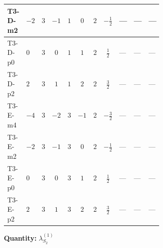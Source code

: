 \documentclass[8pt]{article}
\begin{document}
\begin{landscape}
\begin{longtable}{@{}llcccccc >{\raggedright\arraybackslash}p{0.21\linewidth} >{\raggedright\arraybackslash}p{0.21\linewidth} >{\raggedright\arraybackslash}p{0.21\linewidth}@{}}
\midrule
T3-D-m2 & $-2$ & $3$ & $-1$ & $1$ & $0$ & $2$ & $-\frac{1}{2}$ & --- & --- & --- \\
\midrule
T3-D-p0 & $0$ & $3$ & $0$ & $1$ & $1$ & $2$ & $\frac{1}{2}$ & --- & --- & --- \\
\midrule
T3-D-p2 & $2$ & $3$ & $1$ & $1$ & $2$ & $2$ & $\frac{3}{2}$ & --- & --- & --- \\
\midrule
T3-E-m4 & $-4$ & $3$ & $-2$ & $3$ & $-1$ & $2$ & $-\frac{3}{2}$ & --- & --- & --- \\
\midrule
T3-E-m2 & $-2$ & $3$ & $-1$ & $3$ & $0$ & $2$ & $-\frac{1}{2}$ & --- & --- & --- \\
\midrule
T3-E-p0 & $0$ & $3$ & $0$ & $3$ & $1$ & $2$ & $\frac{1}{2}$ & --- & --- & --- \\
\midrule
T3-E-p2 & $2$ & $3$ & $1$ & $3$ & $2$ & $2$ & $\frac{3}{2}$ & --- & --- & --- \\
\midrule
\bottomrule
\end{longtable}
\clearpage
\noindent\textbf{Quantity: }$\lambda_{S_2}^{(1)}$\par\smallskip

\end{landscape}
\end{document}
